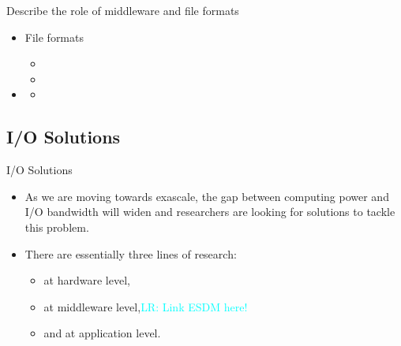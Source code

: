 \documentclass[compress,11pt,xcolor=svgnames,aspectratio=169]{beamer}
\newcommand{\lr}[1]{\textcolor{cyan}{LR: #1}}
\begin{document}
\begin{frame}[fragile] {Describe the role of middleware and file formats}

\begin{itemize}

  \item File formats
    \begin{itemize}
        \item
        \item
    \end{itemize}

  \item
    \begin{itemize}
      \item
    \end{itemize}

\end{itemize}

\end{frame}

\subsection{I/O Solutions}

\begin{frame}[fragile] {I/O Solutions}

\begin{itemize}

\item As we are moving towards exascale, the gap between computing power and I/O bandwidth will
widen and researchers are looking for solutions to tackle this problem.\\[0.4cm]

\item There are essentially three lines of research:\\[0.4cm]

    \begin{itemize}
    \setlength\itemsep{0.6cm}

      \item at hardware level,
      \item at middleware level,\lr{Link ESDM here!}
      \item and at application level.

    \end{itemize}

\end{itemize}

\nocite{3372390}

\end{frame}
\end{document}
